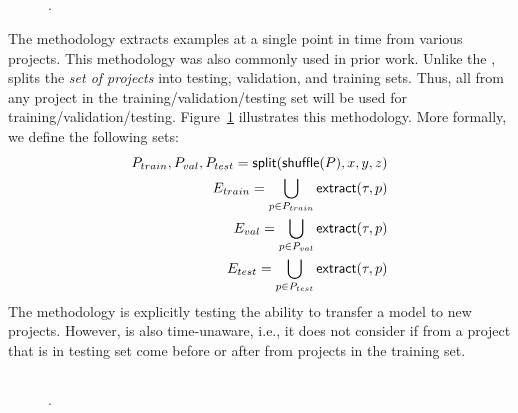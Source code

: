 
\subsection{\Crossproj}

\begin{figure}[t]
  \centering
  
  \caption{\Crossproj \methodology. \label{fig:method-crossproj}}
\end{figure}

The \emph{\crossproj} methodology extracts examples at a single point
in time from various projects.  This methodology was also commonly
used in prior work.  Unlike the \mixedproj \methodology, \crossproj
splits the \emph{set of projects} into testing, validation, and
training sets.  Thus, all \examples from any project in the
training/validation/testing set will be used for
training/validation/testing.
%
Figure~\ref{fig:method-crossproj} illustrates this
methodology.  More formally, we define the following sets:
%
\begin{align*}
  P_{train}, P_{val}, P_{test} = \mathsf{split}(\mathsf{shuffle}(P), x, y, z) \\
  E_{train} = \bigcup_{p \in P_{train}} \mathsf{extract}(\tau, p) \\
  E_{val} = \bigcup_{p \in P_{val}} \mathsf{extract}(\tau, p) \\
  E_{test} = \bigcup_{p \in P_{test}} \mathsf{extract}(\tau, p)
\end{align*}
%
The \crossproj methodology is explicitly testing the ability to
transfer a model to new projects.
%
However, \crossproj is also time-unaware, i.e., it does not consider
if \examples from a project that is in testing set come before or
after \examples from projects in the training set.


\subsection{\Evoaware}

\begin{figure}[t]
  \centering
  
  \caption{\Evoaware \methodology. \label{fig:method-evoaware}}
\end{figure}

